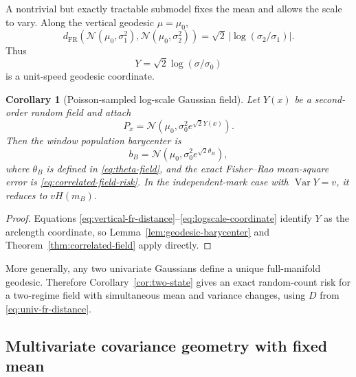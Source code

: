 \documentclass[11pt,a4paper]{article}
\newtheorem{corollary}[theorem]{Corollary}
\theoremstyle{remark}
\begin{document}
A nontrivial but exactly tractable submodel fixes the mean and allows the scale to vary.  Along the vertical geodesic \(\mu=\mu_0\),
\begin{equation}
\label{eq:vertical-fr-distance}
 d_{\mathrm{FR}}\!\left(\mathcal N(\mu_0,\sigma_1^2),
 \mathcal N(\mu_0,\sigma_2^2)\right)
 =\sqrt2\,|\log(\sigma_2/\sigma_1)|.
\end{equation}
Thus
\begin{equation}
\label{eq:logscale-coordinate}
 Y=\sqrt2\log(\sigma/\sigma_0)
\end{equation}
is a unit-speed geodesic coordinate.

\begin{corollary}[Poisson-sampled log-scale Gaussian field]
\label{cor:logscale-field}
Let \(Y(x)\) be a second-order random field and attach
\begin{equation}
\label{eq:logscale-mark}
 P_x=\mathcal N\!\left(\mu_0,
 \sigma_0^2e^{\sqrt2Y(x)}\right).
\end{equation}
Then the window population barycenter is
\begin{equation}
\label{eq:logscale-pop}
 b_B=\mathcal N\!\left(\mu_0,
 \sigma_0^2e^{\sqrt2\theta_B}\right),
\end{equation}
where \(\theta_B\) is defined in \eqref{eq:theta-field}, and the exact Fisher--Rao mean-square error is \eqref{eq:correlated-field-risk}.  In the independent-mark case with \(\operatorname{Var}Y=v\), it reduces to \(vH(m_B)\).
\end{corollary}

\begin{proof}
Equations \eqref{eq:vertical-fr-distance}--\eqref{eq:logscale-coordinate} identify \(Y\) as the arclength coordinate, so Lemma~\ref{lem:geodesic-barycenter} and Theorem~\ref{thm:correlated-field} apply directly.
\end{proof}

More generally, any two univariate Gaussians define a unique full-manifold geodesic.  Therefore Corollary~\ref{cor:two-state} gives an exact random-count risk for a two-regime field with simultaneous mean and variance changes, using \(D\) from \eqref{eq:univ-fr-distance}.

\subsection{Multivariate covariance geometry with fixed mean}
\label{subsec:spd-fr}
\end{document}
